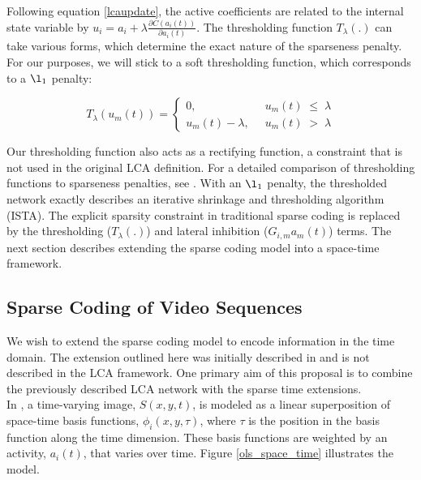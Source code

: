 \documentclass[smallextended]{svjour3}       %
\begin{document}
\noindent Following equation \ref{lcaupdate}, the active coefficients are related to the internal state variable by $u_{i} = a_{i} + \lambda \frac{\partial C(a_{i}(t))}{\partial a_{i}(t)}$. The thresholding function $T_{\lambda}(.)$ can take various forms, which determine the exact nature of the sparseness penalty. For our purposes, we will stick to a soft thresholding function, which corresponds to a $\l_1$ penalty:

\begin{equation}
    T_{\lambda}(u_{m}(t)) = \left\{
    \begin{aligned}
        0,\;\; &u_{m}(t)\; \leq\; \lambda \\
        u_{m}(t)-\lambda,\;\; &u_{m}(t)\; >\; \lambda
    \end{aligned}
    \right.
\label{thresholdfunc}
\end{equation}

\noindent Our thresholding function also acts as a rectifying function, a constraint that is not used in the original LCA definition. For a detailed comparison of thresholding functions to sparseness penalties, see \cite{rozell2008sparse}. With an $\l_1$ penalty, the thresholded network exactly describes an iterative shrinkage and thresholding algorithm (ISTA). The explicit sparsity constraint in traditional sparse coding is replaced by the thresholding ($T_{\lambda}(.)$) and lateral inhibition ($G_{i,m}a_{m}(t)$) terms. The next section describes extending the sparse coding model into a space-time framework.\\

\subsection{Sparse Coding of Video Sequences} \label{sparsetime}
\noindent We wish to extend the sparse coding model to encode information in the time domain. The extension outlined here was initially described in \cite{olshausen2003learning} and is not described in the LCA framework. One primary aim of this proposal is to combine the previously described LCA network with the sparse time extensions.\\

\noindent In \cite{olshausen2003learning}, a time-varying image, $S(x,y,t)$, is modeled as a linear superposition of space-time basis functions, $\phi_i(x,y,\tau)$, where $\tau$ is the position in the basis function along the time dimension. These basis functions are weighted by an activity, $a_i(t)$, that varies over time. Figure \ref{ols_space_time} illustrates the model.\\
\end{document}
